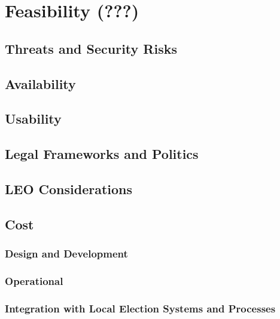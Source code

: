 \chapter{Feasibility (???)}
\label{chapter:feasibility}

\section{Threats and Security Risks}
\section{Availability}
\section{Usability}
\section{Legal Frameworks and Politics}
\section{LEO Considerations}
\section{Cost}
\subsection{Design and Development}
\subsection{Operational}
\subsection{Integration with Local Election Systems and Processes}